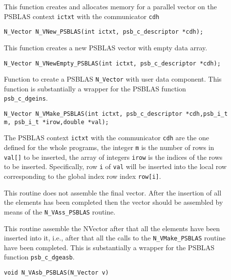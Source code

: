 \documentclass[twoside,a4paper]{refart}
\begin{document}
\begin{description}
	\item[] This function creates and allocates memory for a parallel vector
	on the PSBLAS context \lstinline[style=CStyle]|ictxt| with the communicator \lstinline[style=CStyle]|cdh|
	
	 \lstinline[style=CStyle]|N_Vector N_VNew_PSBLAS(int ictxt, psb_c_descriptor *cdh);|
	
	\item[] This function creates a new PSBLAS vector with empty data array.
	
	 \lstinline[style=CStyle]|N_Vector N_VNewEmpty_PSBLAS(int ictxt, psb_c_descriptor *cdh);|
	
	\item[] Function to create a PSBLAS \texttt{N\_Vector} with user data component. This function is substantially a wrapper for the PSBLAS function \lstinline[style=CStyle]|psb_c_dgeins|.
	
	 \lstinline[style=CStyle]|N_Vector N_VMake_PSBLAS(int ictxt, psb_c_descriptor *cdh,psb_i_t m, psb_i_t *irow,double *val);|
	
	The PSBLAS context \lstinline[style=CStyle]|ictxt| with the communicator \lstinline[style=CStyle]|cdh| are the one defined for the whole programs, the integer \lstinline[style=CStyle]{m} is the number of rows in \lstinline[style=CStyle]{val[]} to be inserted, the array of integers \lstinline[style=CStyle]{irow} is the indices of the rows to be inserted. Specifically, row \lstinline[style=CStyle]|i| of \lstinline[style=CStyle]|val| will be inserted into the local row corresponding to the global index row index \lstinline[style=CStyle]|row[i]|.
	
	\attention This routine does not assemble the final vector. After the insertion of all the elements has been completed then the vector should be assembled by means of the \texttt{N\_VAss\_PSBLAS} routine.
	
	\item[] This routine assemble the NVector after that all the elements have been inserted into it, i.e., after that all the calls to the \texttt{N\_VMake\_PSBLAS} routine have been completed. This is substantially a wrapper for the PSBLAS function \lstinline[style=CStyle]|psb_c_dgeasb|.
	
	 \lstinline[style=CStyle]|void N_VAsb_PSBLAS(N_Vector v)|
	

\end{description}
\end{document}
